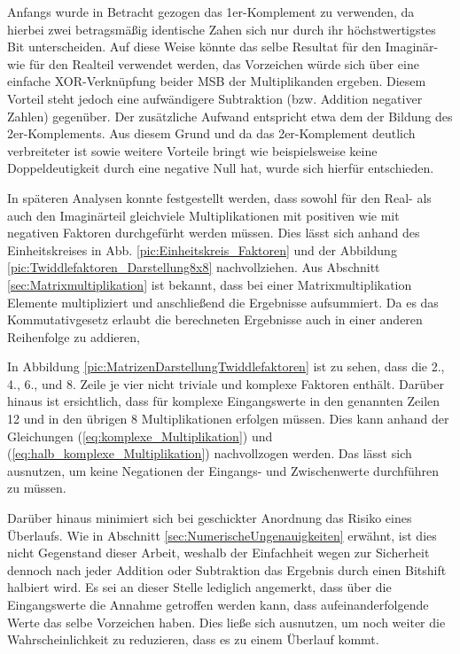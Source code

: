 Anfangs wurde in Betracht gezogen das 1er-Komplement zu verwenden, da hierbei zwei betragsmäßig identische Zahen sich nur durch ihr höchstwertigstes 
 Bit unterscheiden. Auf diese Weise könnte das selbe Resultat für den Imaginär- wie für den Realteil verwendet werden, das Vorzeichen würde sich über eine 
 einfache XOR-Verknüpfung beider MSB der Multiplikanden ergeben.
 Diesem Vorteil steht jedoch eine aufwändigere Subtraktion (bzw. Addition negativer Zahlen) gegenüber. Der zusätzliche Aufwand entspricht 
 etwa dem der Bildung des 2er-Komplements. Aus diesem Grund und da das 2er-Komplement deutlich verbreiteter ist sowie weitere Vorteile bringt wie 
 beispielsweise keine Doppeldeutigkeit durch eine negative Null hat, wurde sich hierfür entschieden.
 
 
 In späteren Analysen konnte festgestellt werden, dass sowohl für den Real- als auch den Imaginärteil gleichviele Multiplikationen mit positiven wie mit negativen Faktoren 
 durchgefürht werden müssen. Dies lässt sich anhand des Einheitskreises in Abb. \ref{pic:Einheitskreis_Faktoren} und der Abbildung \ref{pic:Twiddlefaktoren_Darstellung8x8}
 nachvollziehen. Aus Abschnitt \ref{sec:Matrixmultiplikation} ist bekannt, dass bei einer Matrixmultiplikation Elemente multipliziert und anschließend die Ergebnisse 
 aufsummiert. Da es das Kommutativgesetz erlaubt die berechneten Ergebnisse auch in einer anderen Reihenfolge zu addieren, 

 
   
 In Abbildung \ref{pic:MatrizenDarstellungTwiddlefaktoren} ist zu sehen, dass die 2., 4., 6., und 8. Zeile je vier nicht triviale und komplexe Faktoren enthält. 
 Darüber hinaus ist ersichtlich, dass für komplexe Eingangswerte in den genannten Zeilen 12 und in den übrigen 8 Multiplikationen erfolgen müssen. Dies kann anhand der 
 Gleichungen (\ref{eq:komplexe_Multiplikation}) und (\ref{eq:halb_komplexe_Multiplikation}) nachvollzogen werden.
 Das lässt sich ausnutzen, um keine Negationen der Eingangs- und Zwischenwerte durchführen zu müssen. 
 

 
 Darüber hinaus
 minimiert sich bei geschickter Anordnung das Risiko eines Überlaufs. Wie in Abschnitt \ref{sec:NumerischeUngenauigkeiten} erwähnt, ist dies nicht Gegenstand dieser Arbeit,
 weshalb der Einfachheit wegen zur Sicherheit dennoch nach jeder Addition oder Subtraktion das Ergebnis durch einen Bitshift halbiert wird. 
 Es sei an dieser Stelle lediglich angemerkt, dass über die Eingangswerte die Annahme getroffen werden kann, dass aufeinanderfolgende Werte das selbe Vorzeichen haben. 
 Dies ließe sich ausnutzen, um noch weiter die Wahrscheinlichkeit zu reduzieren, dass es zu einem Überlauf kommt. 
 


